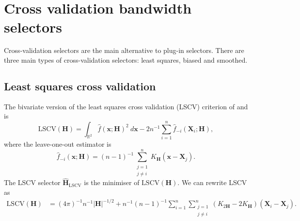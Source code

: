 \documentclass[a4paper,11pt]{article}
\renewcommand{\vec}[1]{\boldsymbol{#1}}
\newcommand{\mat}[1]{\mathbf{#1}}
\def\jneqi{\substack{j=1 \\ j\neq i}}
\def\HH{\mat{H}}
\def\LSCV{\mathrm{LSCV}}
\def\vecx{\vec{x}}
\def\intr2{\int_{\boldsymbol{\mathbb{R}}^2}}
\begin{document}

\section{Cross validation bandwidth selectors}

Cross-validation selectors are the main alternative to plug-in selectors.
There are three main types of cross-validation selectors: 
least squares, biased and smoothed. 

\subsection{Least squares cross validation}
\label{sec:lscv}
The bivariate version of 
the least squares cross validation (LSCV) criterion of
\citet*{rudemo82} and \citet*{bowman84} is 
$$\LSCV (\HH) = \intr2 \hat{f}(\vec{x}; \HH)^2 \ d \vecx - 2n^{-1} \sum_{i=1}^n 
\hat{f}_{-i} (\vec{X}_i; \HH),$$
where the leave-one-out estimator is 
$$\hat{f}_{-i} (\vec{x}; \HH) = (n-1)^{-1} 
\sum_{\jneqi}^n K_\HH (\vec{x} - \vec{X}_j).$$ 
The LSCV selector $\hat{\HH}_\LSCV$ 
is the minimiser of $\LSCV(\HH)$. We can rewrite LSCV as
\begin{align}
\label{eq:lscv2}
\LSCV(\HH) & = (4\pi)^{-1} n^{-1} |\HH|^{-1/2} + n^{-1} (n-1)^{-1} 
\sum_{i=1}^n \sum_{\jneqi}^n 
(K_{2\HH} - 2K_\HH) (\vec{X}_i - \vec{X}_j). 
\end{align}
\end{document}
